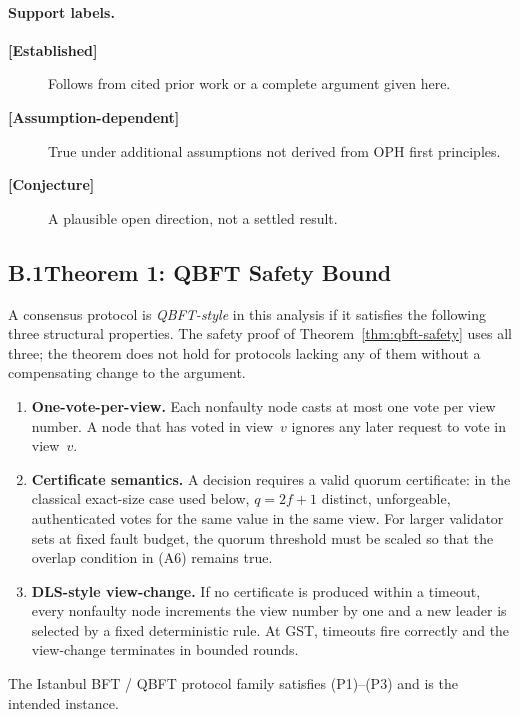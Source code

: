 \paragraph{Support labels.}
\begin{description}
  \item[\textbf{[Established]}] Follows from cited prior work or a complete
        argument given here.
  \item[\textbf{[Assumption-dependent]}] True under additional assumptions not
        derived from \textrm{OPH} first principles.
  \item[\textbf{[Conjecture]}] A plausible open direction, not a settled result.
\end{description}

\subsection*{B.1\quad Theorem 1: QBFT Safety Bound}

\begin{definition}
\label{def:qbft-style}
A consensus protocol is \emph{QBFT-style} in this analysis if it satisfies
the following three structural properties.
The safety proof of Theorem~\ref{thm:qbft-safety} uses all three;
the theorem does not hold for protocols lacking any of them without a
compensating change to the argument.
\begin{enumerate}[(P1)]
  \item \textbf{One-vote-per-view.}
        Each nonfaulty node casts at most one vote per view number.
        A node that has voted in view~$v$ ignores any later request
        to vote in view~$v$.
  \item \textbf{Certificate semantics.}
        A decision requires a valid quorum certificate: in the classical
        exact-size case used below, $q=2f+1$ distinct, unforgeable,
        authenticated votes for the same value in the same view.  For
        larger validator sets at fixed fault budget, the quorum threshold must
        be scaled so that the overlap condition in (A6) remains true.
  \item \textbf{DLS-style view-change.}
        If no certificate is produced within a timeout, every nonfaulty node
        increments the view number by one and a new leader is selected by a
        fixed deterministic rule.  At \textrm{GST}, timeouts fire correctly
        and the view-change terminates in bounded rounds.
\end{enumerate}
The Istanbul BFT / QBFT protocol family
\cite{Moniz2020,Saltini}
satisfies (P1)--(P3) and is the intended instance.
\end{definition}

